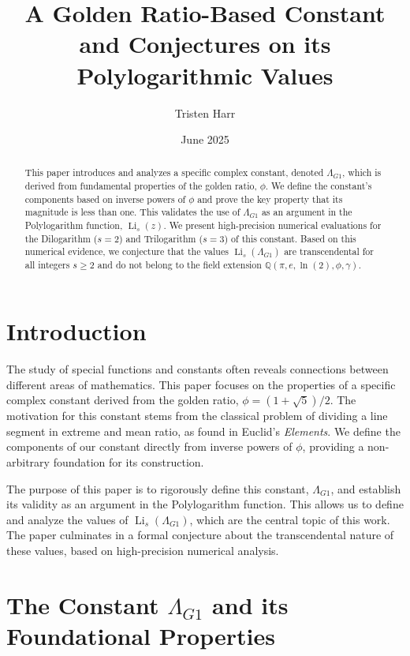 \documentclass{amsart}
\theoremstyle{plain}
\theoremstyle{definition}
\theoremstyle{remark}
\DeclareMathOperator{\Li}{Li} %
\newcommand{\LambdaG}{\Lambda_{G1}}
\begin{document}
\title[A Golden Ratio Constant and its Polylogarithmic Values]{A Golden Ratio-Based Constant and Conjectures on its Polylogarithmic Values}
\author{Tristen Harr}
\date{June 2025}

\begin{abstract}
This paper introduces and analyzes a specific complex constant, denoted $\LambdaG$, which is derived from fundamental properties of the golden ratio, $\phi$. We define the constant's components based on inverse powers of $\phi$ and prove the key property that its magnitude is less than one. This validates the use of $\LambdaG$ as an argument in the Polylogarithm function, $\Li_s(z)$. We present high-precision numerical evaluations for the Dilogarithm ($s=2$) and Trilogarithm ($s=3$) of this constant. Based on this numerical evidence, we conjecture that the values $\Li_s(\LambdaG)$ are transcendental for all integers $s \ge 2$ and do not belong to the field extension $\mathbb{Q}(\pi, e, \ln(2), \phi, \gamma)$.
\end{abstract}

\maketitle

\section{Introduction}
The study of special functions and constants often reveals connections between different areas of mathematics. This paper focuses on the properties of a specific complex constant derived from the golden ratio, $\phi = (1+\sqrt{5})/2$. The motivation for this constant stems from the classical problem of dividing a line segment in extreme and mean ratio, as found in Euclid's \textit{Elements}. We define the components of our constant directly from inverse powers of $\phi$, providing a non-arbitrary foundation for its construction.

The purpose of this paper is to rigorously define this constant, $\LambdaG$, and establish its validity as an argument in the Polylogarithm function. This allows us to define and analyze the values of $\Li_s(\LambdaG)$, which are the central topic of this work. The paper culminates in a formal conjecture about the transcendental nature of these values, based on high-precision numerical analysis.

\section{The Constant \texorpdfstring{$\Lambda_{G1}$}{Lambda\_G1} and its Foundational Properties}
\end{document}
